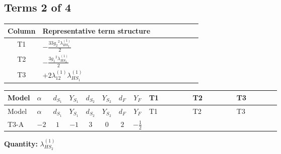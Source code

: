 \documentclass[8pt]{article}
\begin{document}
\begin{landscape}
\subsection*{Terms 2 of 4}
\begin{center}
\begin{tabular}{@{}c >{\raggedright\arraybackslash}p{0.82\linewidth}@{}}
\toprule
Column & Representative term structure \\
\midrule
T1 & \(\displaystyle -\frac{33 {g_2}^2 {\lambda_{HS_2}^{(1)}}}{2}\) \\
\midrule
T2 & \(\displaystyle -\frac{3 {g_1}^2 {\lambda_{HS_2}^{(1)}}}{2}\) \\
\midrule
T3 & \(\displaystyle +2 {\lambda_{12}^{(1)}} {\lambda_{HS_1}^{(1)}}\) \\
\midrule
\bottomrule
\end{tabular}
\end{center}
\smallskip
\tiny
\begin{longtable}{@{}llcccccc >{\raggedright\arraybackslash}p{0.21\linewidth} >{\raggedright\arraybackslash}p{0.21\linewidth} >{\raggedright\arraybackslash}p{0.21\linewidth}@{}}
\toprule
Model & $\alpha$ & $d_{S_1}$ & $Y_{S_1}$ & $d_{S_2}$ & $Y_{S_2}$ & $d_F$ & $Y_F$ & T1 & T2 & T3 \\
\midrule
\endfirsthead
\toprule
Model & $\alpha$ & $d_{S_1}$ & $Y_{S_1}$ & $d_{S_2}$ & $Y_{S_2}$ & $d_F$ & $Y_F$ & T1 & T2 & T3 \\
\midrule
\endhead
T3-A & $-2$ & $1$ & $-1$ & $3$ & $0$ & $2$ & $-\frac{1}{2}$ & \scriptsize\adjustbox{max width=\linewidth}{$\begin{gathered} -\frac{33 {g_2}^2 {\lambda_{HS_2}^{(1)}}}{2}\end{gathered}$} & \scriptsize\adjustbox{max width=\linewidth}{$\begin{gathered} -\frac{3 {g_1}^2 {\lambda_{HS_2}^{(1)}}}{2}\end{gathered}$} & \scriptsize\adjustbox{max width=\linewidth}{$\begin{gathered} +2 {\lambda_{12}^{(1)}} {\lambda_{HS_1}^{(1)}}\end{gathered}$} \\
\midrule
\bottomrule
\end{longtable}
\clearpage
\noindent\textbf{Quantity: }$\lambda_{HS_2}^{(1)}$\par\smallskip

\end{landscape}
\end{document}
